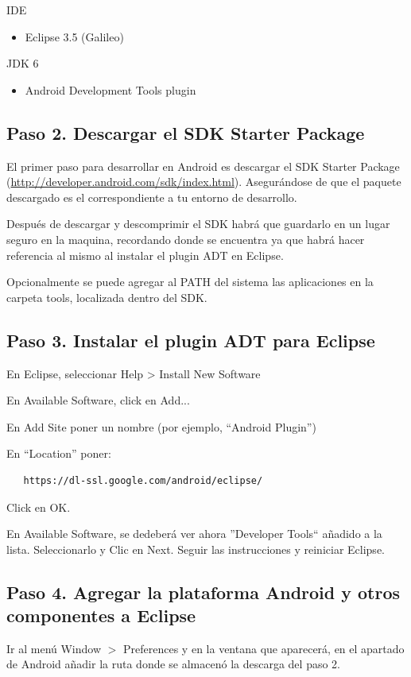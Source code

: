 \documentclass[a4paper,10pt]{article}
\begin{document}
IDE
\begin{itemize}
\item Eclipse 3.5 (Galileo)
\end{itemize}

JDK 6
\begin{itemize}
\item Android Development Tools plugin
\end{itemize}


\subsection{Paso 2. Descargar el SDK Starter Package}
El primer paso para desarrollar en Android es descargar el SDK Starter Package (\url{http://developer.android.com/sdk/index.html}). Asegurándose de que el paquete descargado es el correspondiente a tu entorno de desarrollo.

Después de descargar y descomprimir el SDK habrá que guardarlo en un lugar seguro en la maquina, recordando donde se encuentra ya que habrá hacer referencia al mismo al instalar el plugin ADT en Eclipse.

Opcionalmente se puede agregar al PATH del sistema las aplicaciones en la carpeta tools, localizada dentro del SDK.

\subsection{Paso 3. Instalar el plugin ADT para Eclipse}

En Eclipse, seleccionar Help > Install New Software

En Available Software, click en Add...

En Add Site poner un nombre (por ejemplo, ``Android Plugin'')

En ``Location'' poner:

\begin{verbatim}
   https://dl-ssl.google.com/android/eclipse/
\end{verbatim}

Click en OK.

En Available Software, se dedeberá ver ahora ''Developer Tools`` añadido a la lista. Seleccionarlo y Clic en Next. Seguir las instrucciones y reiniciar Eclipse.
\subsection{Paso 4. Agregar la plataforma Android y otros componentes a Eclipse}
Ir al menú Window $>$ Preferences y en la ventana que aparecerá,  en el apartado de Android añadir la ruta donde se almacenó la descarga del paso 2.
\end{document}
